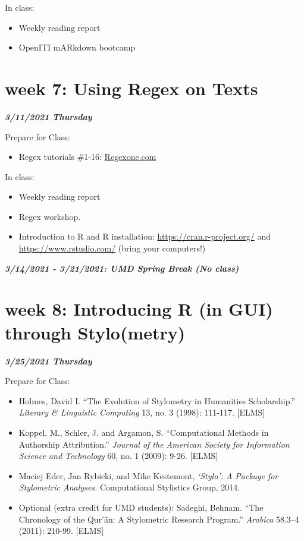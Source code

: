 \documentclass[
]{book}
\providecommand{\tightlist}{%
  \setlength{\itemsep}{0pt}\setlength{\parskip}{0pt}}
\begin{document}
In class:

\begin{itemize}
\tightlist
\item
  Weekly reading report
\item
  OpenITI mARkdown bootcamp
\end{itemize}

\hypertarget{week-7-using-regex-on-texts-1}{%
\chapter{week 7: Using Regex on Texts}\label{week-7-using-regex-on-texts-1}}

\textbf{\emph{3/11/2021 Thursday}}

Prepare for Class:

\begin{itemize}
\tightlist
\item
  Regex tutorials \#1-16: \url{Regexone.com}
\end{itemize}

In class:

\begin{itemize}
\tightlist
\item
  Weekly reading report
\item
  Regex workshop.
\item
  Introduction to R and R installation: \url{https://cran.r-project.org/} and \url{https://www.rstudio.com/} (bring your computers!)
\end{itemize}

\textbf{\emph{3/14/2021 - 3/21/2021: UMD Spring Break (No class)}}

\hypertarget{week-8-introducing-r-in-gui-through-stylometry-1}{%
\chapter{week 8: Introducing R (in GUI) through Stylo(metry)}\label{week-8-introducing-r-in-gui-through-stylometry-1}}

\textbf{\emph{3/25/2021 Thursday}}

Prepare for Class:

\begin{itemize}
\tightlist
\item
  Holmes, David I. ``The Evolution of Stylometry in Humanities Scholarship.'' \emph{Literary \& Linguistic Computing} 13, no. 3 (1998): 111-117. {[}ELMS{]}
\item
  Koppel, M., Schler, J. and Argamon, S. ``Computational Methods in Authorship Attribution.'' \emph{Journal of the American Society for Information Science and Technology} 60, no. 1 (2009): 9-26. {[}ELMS{]}
\item
  Maciej Eder, Jan Rybicki, and Mike Kestemont, \emph{`Stylo': A Package for Stylometric Analyses.} Computational Stylistics Group, 2014.
\item
  Optional (extra credit for UMD students): Sadeghi, Behnam. ``The Chronology of the Qur'ān: A Stylometric Research Program.'' \emph{Arabica} 58.3--4 (2011): 210-99. {[}ELMS{]}
\end{itemize}
\end{document}

